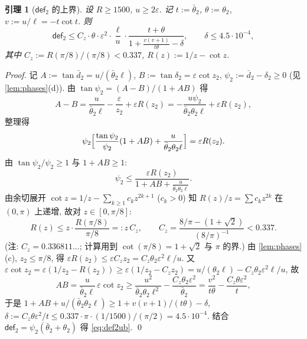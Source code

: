 \documentclass[UTF8]{ctexart}
\newtheorem{lemma}[theorem]{引理}
\begin{document}
\begin{lemma}[$\mathsf{def}_2$ 的上界]\label{lem:def2}
设 $R\ge1500$, $u\ge2\varepsilon$. 记 $t:=\bar\theta_2$, $\theta:=\theta_2$,
$v:=u/\ell=-t\cot t$. 则
\begin{equation}
	\mathsf{def}_2\le C_z\cdot\theta\cdot\varepsilon^2\cdot\frac{\ell}{u}\cdot\frac{t+\theta}{1+\frac{v(v+1)}{t\theta}-\delta},
	\qquad \delta\le4.5\cdot10^{-4},
	\label{eq:def2ub}
\end{equation}
其中 $C_z:=R(\pi/8)/(\pi/8)<0.337$, $R(z):=1/z-\cot z$.
\end{lemma}
\begin{proof}
记 $A:=\tan\bar d_2=u/(\bar\theta_2\ell)$, $B:=\tan\delta_2=\varepsilon\cot z_2$,
$\psi_2:=\bar d_2-\delta_2\ge0$ (见 \ref{lem:phases}(d)). 由
$\tan\psi_2=(A-B)/(1+AB)$ 得
\begin{equation}
	A-B=\frac{u}{\bar\theta_2\ell}-\frac{\varepsilon}{z_2}+\varepsilon R(z_2)
	=-\frac{u\psi_2}{\bar\theta_2\theta_2\ell}+\varepsilon R(z_2),
\end{equation}
整理得
\begin{equation}
	\psi_2\Bigl[\frac{\tan\psi_2}{\psi_2}(1+AB)+\frac{u}{\bar\theta_2\theta_2\ell}\Bigr]
	=\varepsilon R(z_2).
	\label{eq:psi2}
\end{equation}
由 $\tan\psi_2/\psi_2\ge1$ 与 $1+AB\ge1$:
\begin{equation}
	\psi_2\le\frac{\varepsilon R(z_2)}{1+AB+\frac{u}{\bar\theta_2\theta_2\ell}}.
\end{equation}
由余切展开 $\cot z=1/z-\sum_{k\ge1}c_kz^{2k+1}$ ($c_k>0$) 知 $R(z)/z=\sum c_kz^{2k}$
在 $(0,\pi)$ 上递增, 故对 $z\in[0,\pi/8]$:
\begin{equation}
	R(z)\le z\cdot\frac{R(\pi/8)}{\pi/8}=:z\,C_z,
	\qquad C_z=\frac{8/\pi-(1+\sqrt2)}{(8/\pi)^{-1}}<0.337.
	\label{eq:Cz}
\end{equation}
(注: $C_z=0.336811\ldots$; 计算用到 $\cot(\pi/8)=1+\sqrt2$ 与 $\pi$ 的界.)
由 \ref{lem:phases}(c), $z_2\le\pi/8$, 得 $\varepsilon R(z_2)\le\varepsilon C_z z_2=C_z\theta_2\varepsilon^2\ell/u$.
又 $\varepsilon\cot z_2=\varepsilon(1/z_2-R(z_2))\ge\varepsilon(1/z_2-C_zz_2)=u/(\theta_2\ell)-C_z\theta_2\varepsilon^2\ell/u$, 故
\begin{equation}
	AB=\frac{u}{\bar\theta_2\ell}\,\varepsilon\cot z_2
	\ge\frac{u^2}{\bar\theta_2\theta_2\ell^2}-\frac{C_z\theta_2\varepsilon^2}{\bar\theta_2}
	=\frac{v^2}{t\theta}-\frac{C_z\theta\varepsilon^2}{t},
\end{equation}
于是 $1+AB+u/(\bar\theta_2\theta_2\ell)\ge1+v(v+1)/(t\theta)-\delta$,
$\delta:=C_z\theta\varepsilon^2/t\le0.337\cdot\pi\cdot(1/1500)/(\pi/2)=4.5\cdot10^{-4}$.
结合 $\mathsf{def}_2=\psi_2(\bar\theta_2+\theta_2)$ 得 \eqref{eq:def2ub}. \qed
\end{proof}
\end{document}
